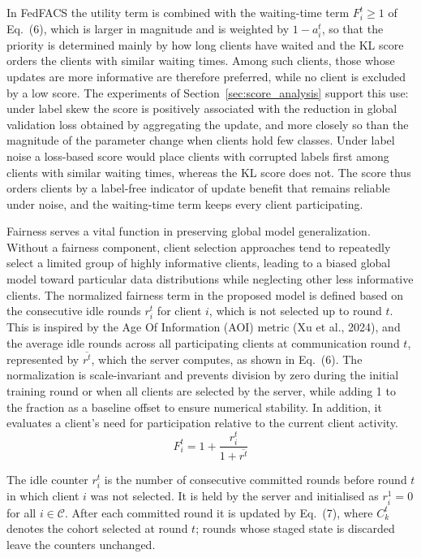 \documentclass[pdflatex,sn-mathphys-num,oneside]{sn-jnl}%
\theoremstyle{thmstyleone}%
\theoremstyle{thmstyletwo}%
\theoremstyle{thmstylethree}%
\begin{document}
In FedFACS the utility term is combined with the waiting-time term $F_i^t\ge 1$ of Eq.~(6), which is larger in magnitude and is weighted by $1-a_i^t$, so that the priority is determined mainly by how long clients have waited and the KL score orders the clients with similar waiting times. Among such clients, those whose updates are more informative are therefore preferred, while no client is excluded by a low score. The experiments of Section~\ref{sec:score_analysis} support this use: under label skew the score is positively associated with the reduction in global validation loss obtained by aggregating the update, and more closely so than the magnitude of the parameter change when clients hold few classes. Under label noise a loss-based score would place clients with corrupted labels first among clients with similar waiting times, whereas the KL score does not. The score thus orders clients by a label-free indicator of update benefit that remains reliable under noise, and the waiting-time term keeps every client participating.

Fairness serves a vital function in preserving global model generalization. Without a fairness component, client selection approaches tend to repeatedly select a limited group of highly informative clients, leading to a biased global model toward particular data distributions while neglecting other less informative clients. The normalized fairness term in the proposed model is defined based on the consecutive idle rounds $r_i^t$ for client $i$, which is not selected up to round $t$. This is inspired by the Age Of Information (AOI) metric (Xu et al., 2024), and the average idle rounds across all participating clients at communication round $t$, represented by $\overline{r^t}$, which the server computes, as shown in Eq.~(6). The normalization is scale-invariant and prevents division by zero during the initial training round or when all clients are selected by the server, while adding 1 to the fraction as a baseline offset to ensure numerical stability. In addition, it evaluates a client’s need for participation relative to the current client activity.
\begin{equation}
F_i^t = 1 + \frac{r_i^t}{1 + \overline{r^t}}
\label{eq:fairness}
\end{equation}

The idle counter $r_i^t$ is the number of consecutive committed rounds before round $t$ in which client $i$ was not selected. It is held by the server and initialised as $r_i^1=0$ for all $i\in\mathcal{C}$. After each committed round it is updated by Eq.~(7), where $C_k^t$ denotes the cohort selected at round $t$; rounds whose staged state is discarded leave the counters unchanged.
\end{document}
